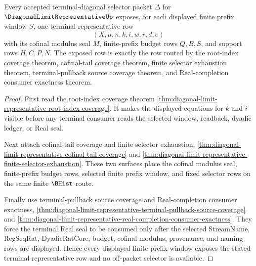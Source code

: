 \begin{theorem}
\label{thm:diagonal-limit-representative-terminal-diagonal-coverage}
Every accepted terminal-diagonal selector packet $\Delta$ for $\DiagonalLimitRepresentativeUp$ exposes, for each displayed finite prefix window $S$, one terminal representative row
$$
(X,\mu,n,k,i,w,r,d,e)
$$
with its cofinal modulus seal $M$, finite-prefix budget rows $Q,B,S$, and support rows $H,C,P,N$. The exposed row is exactly the row routed by the root-index coverage theorem, cofinal-tail coverage theorem, finite selector exhaustion theorem, terminal-pullback source coverage theorem, and Real-completion consumer exactness theorem.
\end{theorem}
\begin{proof}
First read the root-index coverage theorem \autoref{thm:diagonal-limit-representative-root-index-coverage}. It makes the displayed equations for $k$ and $i$ visible before any terminal consumer reads the selected window, readback, dyadic ledger, or Real seal.

Next attach cofinal-tail coverage and finite selector exhaustion, \autoref{thm:diagonal-limit-representative-cofinal-tail-coverage} and \autoref{thm:diagonal-limit-representative-finite-selector-exhaustion}. These two surfaces place the cofinal modulus seal, finite-prefix budget rows, selected finite prefix window, and fixed selector rows on the same finite $\BHist$ route.

Finally use terminal-pullback source coverage and Real-completion consumer exactness, \autoref{thm:diagonal-limit-representative-terminal-pullback-source-coverage} and \autoref{thm:diagonal-limit-representative-real-completion-consumer-exactness}. They force the terminal Real seal to be consumed only after the selected StreamName, RegSeqRat, DyadicRatCore, budget, cofinal modulus, provenance, and naming rows are displayed. Hence every displayed finite prefix window exposes the stated terminal representative row and no off-packet selector is available.
\end{proof}

